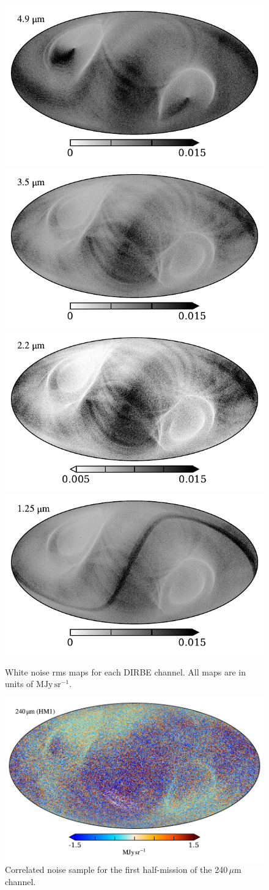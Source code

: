 \documentclass{aa}
\begin{document}
\begin{figure}
  \includegraphics[width=0.39\linewidth]{figs/rms_maps/rms_04.pdf}         
  \includegraphics[width=0.39\linewidth]{figs/rms_maps/rms_03.pdf}\\
  \includegraphics[width=0.39\linewidth]{figs/rms_maps/rms_02.pdf}
  \includegraphics[width=0.39\linewidth]{figs/rms_maps/rms_01.pdf}       
	\caption{White noise rms maps for each DIRBE channel. All maps are in units of $\mathrm{MJy\,sr^{-1}}$.}
  \label{fig:sigma0_map}
\end{figure}


\begin{figure}
	\centering
  
	\includegraphics[width=\columnwidth]{figs/ncorr_240a.pdf}

	\caption{Correlated noise sample for the first half-mission of the 240$\,\mu$m channel.}
	\label{fig:ncorr}
\end{figure}
\end{document}
